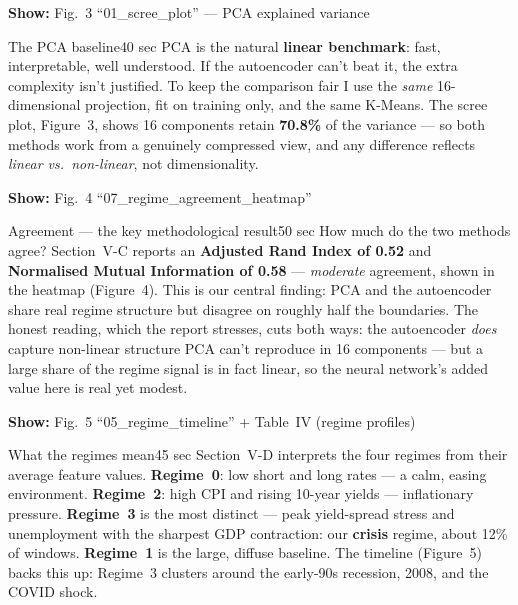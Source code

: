 \documentclass[11pt]{article}
\newcommand{\reportref}[1]{{\small\color{ink}\textbf{Show:} #1}}
\begin{document}
\begin{slide}\reportref{Fig.~3 ``01\_scree\_plot'' --- PCA explained variance}\end{slide}
\begin{cue}{The PCA baseline}{40 sec}
PCA is the natural \textbf{linear benchmark}: fast, interpretable, well understood.
If the autoencoder can't beat it, the extra complexity isn't justified. To keep the
comparison fair I use the \emph{same} 16-dimensional projection, fit on training
only, and the same K-Means. The scree plot, Figure~3, shows 16 components retain
\textbf{70.8\%} of the variance --- so both methods work from a genuinely compressed
view, and any difference reflects \emph{linear vs.\ non-linear}, not dimensionality.
\end{cue}

\begin{slide}\reportref{Fig.~4 ``07\_regime\_agreement\_heatmap''}\end{slide}
\begin{cue}{Agreement --- the key methodological result}{50 sec}
How much do the two methods agree? Section~V-C reports an \textbf{Adjusted Rand
Index of 0.52} and \textbf{Normalised Mutual Information of 0.58} --- \emph{moderate}
agreement, shown in the heatmap (Figure~4). This is our central finding: PCA and
the autoencoder share real regime structure but disagree on roughly half the
boundaries. The honest reading, which the report stresses, cuts both ways: the
autoencoder \emph{does} capture non-linear structure PCA can't reproduce in 16
components --- but a large share of the regime signal is in fact linear, so the
neural network's added value here is real yet modest.
\end{cue}

\begin{slide}\reportref{Fig.~5 ``05\_regime\_timeline'' + Table~IV (regime profiles)}\end{slide}
\begin{cue}{What the regimes mean}{45 sec}
Section~V-D interprets the four regimes from their average feature values.
\textbf{Regime~0}: low short and long rates --- a calm, easing environment.
\textbf{Regime~2}: high CPI and rising 10-year yields --- inflationary pressure.
\textbf{Regime~3} is the most distinct --- peak yield-spread stress and unemployment
with the sharpest GDP contraction: our \textbf{crisis} regime, about 12\% of
windows. \textbf{Regime~1} is the large, diffuse baseline. The timeline (Figure~5)
backs this up: Regime~3 clusters around the early-90s recession, 2008, and the COVID
shock.
\end{cue}
\end{document}
